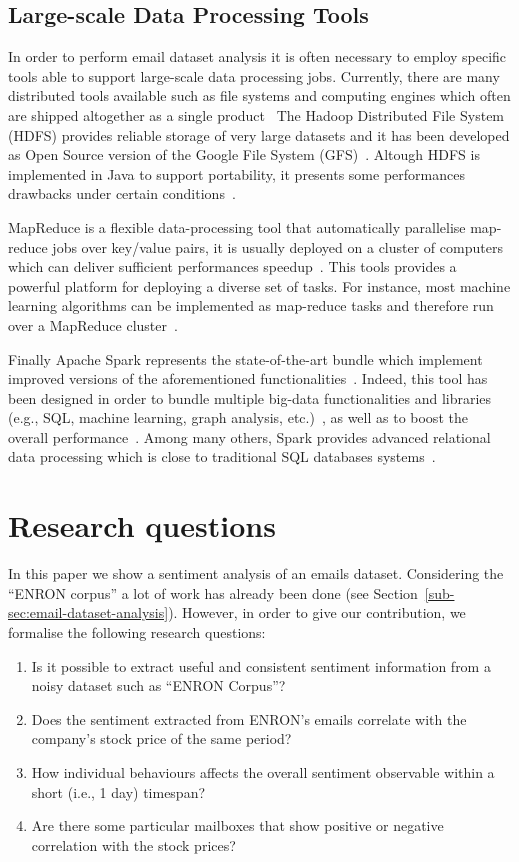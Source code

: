 \documentclass{vldb}
\begin{document}
\subsection{Large-scale Data Processing Tools}
In order to perform email dataset analysis it is often necessary to employ specific tools able to support large-scale data processing jobs.
Currently, there are many distributed tools available such as file systems and computing engines which often are shipped altogether as a single product~\cite{shvachko2010hadoop, zaharia2012resilient, meng2015mllib, shoro2015big, dean2008mapreduce, dean2010mapreduce}
The Hadoop Distributed File System (HDFS) provides reliable storage of very large datasets and it has been developed as Open Source version of the Google File System (GFS)~\cite{shvachko2010hadoop, ghemawat2003google}.
Altough HDFS is implemented in Java to support portability, it presents some performances drawbacks under certain conditions~\cite{shafer2010hadoop}.

MapReduce is a flexible data-processing tool that automatically parallelise map-reduce jobs over key/value pairs, it is usually deployed on a cluster of computers which can deliver sufficient performances speedup~\cite{dean2010mapreduce}.
This tools provides a powerful platform for deploying a diverse set of tasks.
For instance, most machine learning algorithms can be implemented as map-reduce tasks and therefore run over a MapReduce cluster~\cite{chu2007map}. 

Finally Apache Spark represents the state-of-the-art bundle which implement improved versions of the aforementioned functionalities~\cite{shoro2015big}.
Indeed, this tool has been designed in order to bundle multiple big-data functionalities and libraries (e.g., SQL, machine learning, graph analysis, etc.)~\cite{meng2015mllib}, as well as to boost the overall performance~\cite{gopalani2015comparing}.
Among many others, Spark provides advanced relational data processing which is close to traditional SQL databases systems~\cite{armbrust2015spark}. 


\section{Research questions}
\label{sec:r-q}
In this paper we show a sentiment analysis of an emails dataset.
Considering the ``ENRON corpus'' a lot of work has already been done (see Section~\ref{sub-sec:email-dataset-analysis}).
However, in order to give our contribution, we formalise the following research questions:
\begin{enumerate}
	\item Is it possible to extract useful and consistent sentiment information
		from a noisy dataset such as ``ENRON Corpus''?
	\item Does the sentiment extracted from ENRON's emails correlate with the company's stock price of the same period?
	\item How individual behaviours affects the overall sentiment observable
		within a short (i.e., 1 day) timespan?
	\item Are there some particular mailboxes that show positive or negative
		correlation with the stock prices?
\end{enumerate}
\end{document}

